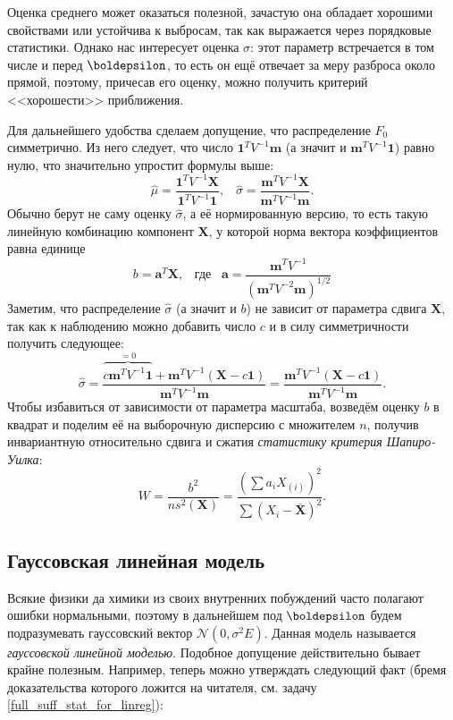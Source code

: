 {\begin{example}
    Оценка среднего может оказаться полезной, зачастую она обладает хорошими свойствами или устойчива к выбросам, так как выражается через порядковые статистики. Однако нас интересует оценка $\sigma$: этот параметр встречается в том числе и перед $\boldepsilon$, то есть он ещё отвечает за меру разброса около прямой, поэтому, причесав его оценку, можно получить критерий <<хорошести>> приближения.

    Для дальнейшего удобства сделаем допущение, что распределение $F_0$ симметрично. Из него следует, что число $\mathbf{1}^T V^{-1} \mathbf{m}$ (а значит и $\mathbf{m}^T V^{-1} \mathbf{1}$) равно нулю, что значительно упростит формулы выше:
    \[
    \widehat{\mu} = \frac{\mathbf{1}^T V^{-1}\mathbf X}{\mathbf{1}^T V^{-1}\mathbf{1}},\;\;\;
    \widehat{\sigma} = \frac{\mathbf{m}^T V^{-1} \mathbf X}{\mathbf{m}^T V^{-1} \mathbf{m}}.
    \]
    Обычно берут не саму оценку $\widehat{\sigma}$, а её нормированную версию, то есть такую линейную комбинацию компонент $\mathbf X$, у которой норма вектора коэффициентов равна единице
    \[
    b = \mathbf{a}^T\mathbf X,\;\;\;\text{где}\;\;\;\mathbf{a} = \frac{\mathbf{m}^T V^{-1}}{\left(\mathbf{m}^T V^{-2}\mathbf{m}\right)^{1/2}}
    \]
    Заметим, что распределение $\widehat\sigma$ (а значит и $b$) не зависит от параметра сдвига $\mathbf X$, так как к наблюдению можно добавить число $c$ и в силу симметричности получить следующее:
    \[
    \widehat{\sigma} = \frac{\overbrace{c\mathbf{m}^T V^{-1} \mathbf{1}}^{=0} + \mathbf{m}^T V^{-1}(\mathbf X - c\mathbf{1})}{\mathbf{m}^T V^{-1} \mathbf{m}} = \frac{\mathbf{m}^T V^{-1}(\mathbf X - c\mathbf{1})}{\mathbf{m}^T V^{-1} \mathbf{m}}.
    \]
    Чтобы избавиться от зависимости от параметра масштаба, возведём оценку $b$ в квадрат и поделим её на выборочную дисперсию с множителем $n$, получив инвариантную относительно сдвига и сжатия \textit{статистику критерия Шапиро-Уилка}:
    \[
    W = \frac{b^2}{ns^2(\mathbf X)} = \frac{\left(\sum a_i X_{(i)}\right)^2}{\sum \left(X_i - \overline{\mathbf X}\right)^2}.
    \]
\end{example}
}

\subsection{Гауссовская линейная модель}

Всякие физики да химики из своих внутренних побуждений часто полагают ошибки нормальными, поэтому в дальнейшем под $\boldepsilon$ будем подразумевать гауссовский вектор $\mathcal{N}(0, \sigma^2 E)$. Данная модель называется \textit{гауссовской линейной моделью}. Подобное допущение действительно бывает крайне полезным. Например, теперь можно утверждать следующий факт (бремя доказательства которого ложится на читателя, см. задачу \ref{full_suff_stat_for_linreg}):

